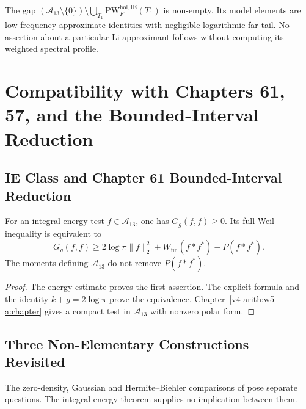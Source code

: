 \begin{remark}
\label{v4-arith:w7-e:rem:gap-captures}
The gap
\((\mathscr A_{13}\setminus\{0\})\setminus\bigcup_{T_{1}}\mathrm{PW}^{\mathrm{hol},\mathrm{IE}}_{F}(T_{1})\)
is non-empty. Its model elements are low-frequency approximate
identities with negligible logarithmic far tail. No assertion about a
particular Li approximant follows without computing its weighted
spectral profile.
\end{remark}

\section{Compatibility with Chapters 61, 57, and the Bounded-Interval Reduction}
\label{v4-arith:w7-e:compatibility}

\subsection{IE Class and Chapter 61 Bounded-Interval Reduction}
\label{v4-arith:w7-e:compat-ch61}

\begin{proposition}
\label{v4-arith:w7-e:prop:compat-bounded}
For an integral-energy test $f\in\mathscr A_{13}$, one has
$G_g(f,f)\ge0$. Its full Weil inequality is equivalent to
\[
 G_g(f,f)\ge 2\log\pi\|f\|_2^2
                  +W_{\mathrm{fin}}(f*f^*)-P(f*f^*).
\]
The moments defining $\mathscr A_{13}$ do not remove $P(f*f^*)$.
\end{proposition}
\begin{proof}
The energy estimate proves the first assertion. The explicit formula
and the identity $k+g=2\log\pi$ prove the equivalence.
Chapter~\ref{v4-arith:w5-a:chapter} gives a compact test in
$\mathscr A_{13}$ with nonzero polar form.
\end{proof}

\subsection{Three Non-Elementary Constructions Revisited}
\label{v4-arith:w7-e:three-constructions}

The zero-density, Gaussian and Hermite--Biehler comparisons of
 pose separate questions.
The integral-energy theorem supplies no implication between them.

